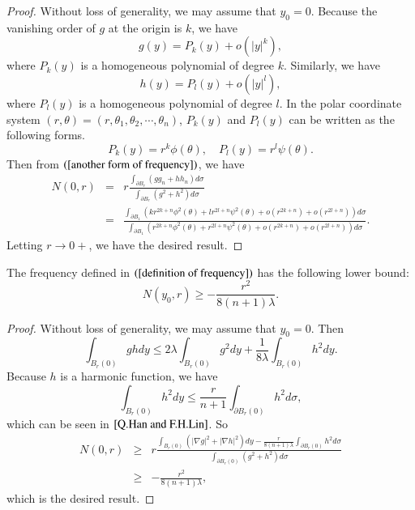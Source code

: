 \documentclass[a4paper, 12pt, onecolumn]{article} \textwidth 148mm
\begin{document}
 \begin{proof}
 Without loss of generality, we may assume that $y_0=0$. Because the vanishing order of $g$ at the origin is $k$, we have
 \begin{equation*}
 g(y)=P_k(y)+o(|y|^k),
 \end{equation*}
 where $P_k(y)$ is a homogeneous polynomial of degree $k$. Similarly, we have
 \begin{equation*}
 h(y)=P_l(y)+o(|y|^l),
 \end{equation*}
 where $P_l(y)$ is a homogeneous polynomial of degree $l$. In the polar coordinate system $(r,\theta)=(r,\theta_1,\theta_2,\cdots,\theta_n)$, $P_k(y)$ and $P_l(y)$ can be written as the following forms.
 \begin{equation*}
 P_k(y)=r^k\phi(\theta),\quad P_l(y)=r^l\psi(\theta).
 \end{equation*}
 Then from $(\ref{another form of frequency})$, we have
 \begin{eqnarray*}
 N(0,r)&=&r\frac{\int_{\partial B_r}\left(gg_n+hh_n\right)d\sigma}{\int_{\partial B_r}\left(g^2+h^2\right)d\sigma}
 \\&=&
 \frac{\int_{\partial B_1}\left(kr^{2k+n}\phi^2(\theta)+lr^{2l+n}\psi^2(\theta)+o(r^{2k+n})+o(r^{2l+n})\right)d\sigma}{\int_{\partial B_1}\left(r^{2k+n}\phi^2(\theta)+r^{2l+n}\psi^2(\theta)+o(r^{2k+n})+o(r^{2l+n})\right)d\sigma}.
 \end{eqnarray*}
 Letting $r\longrightarrow0+$, we have the desired result.
 \end{proof}

 \begin{lemma}\label{lower bound for the frequency}
 The frequency defined in $(\ref{definition of frequency})$ has the following lower bound:
 \begin{equation}\label{lemma lower bound for the frequency}
 N(y_0,r)\geq-\frac{r^2}{8(n+1)\lambda}.
 \end{equation}
 \end{lemma}


\begin{proof}
Without loss of generality, we may assume that $y_0=0$. Then
\begin{equation*}
\int_{B_r(0)}ghdy\leq2\lambda\int_{B_r(0)}g^2dy+\frac{1}{8\lambda}\int_{B_r(0)}h^2dy.
\end{equation*}
Because $h$ is a harmonic function, we have
\begin{equation*}
\int_{B_r(0)}h^2dy\leq\frac{r}{n+1}\int_{\partial B_r(0)}h^2d\sigma,
\end{equation*}
which can be seen in $\cite{Q.Han and F.H.Lin}$.
So
\begin{eqnarray*}
N(0,r)&\geq& r\frac{\int_{B_r(0)}\left(|\nabla g|^2+|\nabla h|^2\right)dy-\frac{r}{8(n+1)\lambda}\int_{\partial B_r(0)}h^2d\sigma}{\int_{\partial B_r(0)}\left(g^2+h^2\right)d\sigma}
\\&\geq&-\frac{r^2}{8(n+1)\lambda},
\end{eqnarray*}
which is the desired result.
\end{proof}
\end{document}
